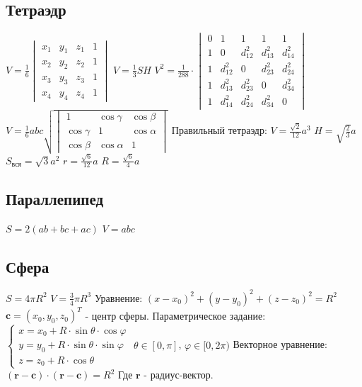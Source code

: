 \subsection{Тетраэдр}
$ V = \frac{1}{6} \begin{vmatrix}
	x_1 & y_1 & z_1 & 1 \\
	x_2 & y_2 & z_2 & 1 \\
	x_3 & y_3 & z_3 & 1 \\
	x_4 & y_4 & z_4 & 1
\end{vmatrix} $
$ V = \frac13 S H $
$ V^2 = \frac{1}{288}\cdot
\begin{vmatrix}
  0 & 1        & 1        & 1        & 1        \\
  1 & 0        & d_{12}^2 & d_{13}^2 & d_{14}^2 \\
  1 & d_{12}^2 & 0        & d_{23}^2 & d_{24}^2 \\
  1 & d_{13}^2 & d_{23}^2 & 0        & d_{34}^2 \\
  1 & d_{14}^2 & d_{24}^2 & d_{34}^2 & 0
\end{vmatrix} $
$ V = \frac16 abc \sqrt{\begin{vmatrix}
  1 & \cos \gamma  & \cos \beta \\
  \cos \gamma & 1 & \cos \alpha \\
  \cos \beta & \cos \alpha & 1
\end{vmatrix}} $
Правильный тетраэдр:
$ V = \frac{\sqrt{2}}{12} a^3 $
$ H = \sqrt{\frac{2}{3}} a $
$ S_\text{вся} = \sqrt{3} a^2 $
$ r = \frac{\sqrt{6}}{12} a $
$ R = \frac{\sqrt{6}}{4} a $
\subsection{Параллепипед}
$ S = 2(ab + bc + ac) $
$ V = abc $
\subsection{Сфера}
$ S = 4 \pi R^2 $
$ V = \frac{3}{4} \pi R^3 $
Уравнение:
$ (x-x_0)^2 + (y-y_0)^2 + (z-z_0)^2 = R^2 $
$ \boldsymbol{c} = (x_0, y_0, z_0)^T $ - центр сферы.
Параметрическое задание:
$\begin{cases}
	x = x_0 + R\cdot \sin\theta \cdot \cos \varphi \\
	y = y_0 + R\cdot \sin\theta \cdot \sin \varphi \\
	z = z_0 + R\cdot \cos\theta
\end{cases} $
$ \theta \in [0, \pi] $, $ \varphi \in [0, 2\pi) $
Векторное уравнение:
$ (\boldsymbol{r} - \boldsymbol{c})\cdot (\boldsymbol{r} - \boldsymbol{c}) = R^2 $
Где $\boldsymbol{r}$ - радиус-вектор.
